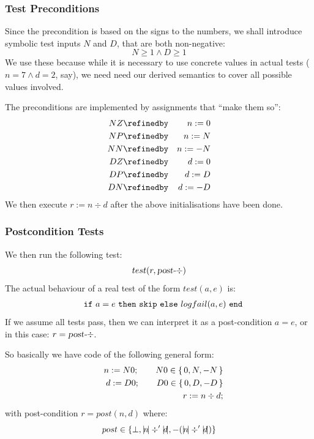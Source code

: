 \subsubsection{Test Preconditions}

Since the precondition is based on the signs to the numbers,
we shall introduce symbolic test inputs $N$ and $D$, 
that are both non-negative:
$$ N \geq 1 \land D \geq 1$$
We use these because while it is necessary 
to use concrete values in actual tests 
($n=7 \land d =2$, say),
we need need our derived semantics to cover all possible values involved.

The preconditions are implemented by assignments that ``make them so'':
\begin{eqnarray*}
   NZ &\refinedby& n := 0
\\ NP &\refinedby& n := N
\\ NN &\refinedby& n := -N
\\ DZ &\refinedby& d := 0
\\ DP &\refinedby& d := D
\\ DN &\refinedby& d := -D
\end{eqnarray*}
We then execute $r := n \div d$ 
after the above initialisations have been done.

\newpage
\subsubsection{Postcondition Tests}

We then run the following test:
$$test(r,\textsl{post-}\div)$$
The actual behaviour of a real test of the form $test(a,e)$ is:
\begin{eqnarray*}
   && \mathtt{if\ } a = e \mathtt{\ then\ } \mathtt{skip} \mathtt{\ else\ } logfail(a,e) \mathtt{\ end}
\end{eqnarray*}
If we assume all tests pass, 
then we can interpret it as a post-condition $a=e$,
or in this case: $r = \textsl{post-}\div$.

So basically we have code of the following general form:
\begin{eqnarray*}
   && n := N0 ; \qquad  N0 \in \{\,0,N,-N\,\}  
\\ && d := D0 ; \qquad  D0 \in \{\,0,D,-D\,\} 
\\ && r := n \div d ;
\end{eqnarray*}
with post-condition $r = post(n,d)$
where:
$$
post \in \{ \bot, \abs n \div' \abs d, -(\abs n \div' \abs d)\}
$$


